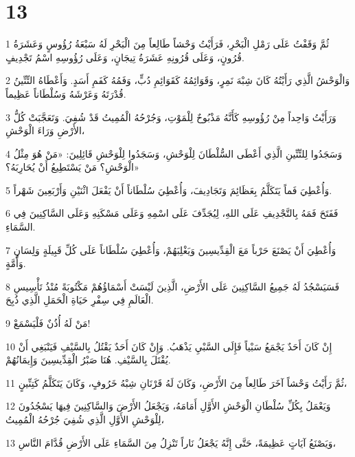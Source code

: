 \chapter{13}

\par 1 ثُمَّ وَقَفْتُ عَلَى رَمْلِ الْبَحْرِ، فَرَأَيْتُ وَحْشاً طَالِعاً مِنَ الْبَحْرِ لَهُ سَبْعَةُ رُؤُوسٍ وَعَشَرَةُ قُرُونٍ، وَعَلَى قُرُونِهِ عَشَرَةُ تِيجَانٍ، وَعَلَى رُؤُوسِهِ اسْمُ تَجْدِيفٍ.
\par 2 وَالْوَحْشُ الَّذِي رَأَيْتُهُ كَانَ شِبْهَ نَمِرٍ، وَقَوَائِمُهُ كَقَوَائِمِ دُبٍّ، وَفَمُهُ كَفَمِ أَسَدٍ. وَأَعْطَاهُ التِّنِّينُ قُدْرَتَهُ وَعَرْشَهُ وَسُلْطَاناً عَظِيماً.
\par 3 وَرَأَيْتُ وَاحِداً مِنْ رُؤُوسِهِ كَأَنَّهُ مَذْبُوحٌ لِلْمَوْتِ، وَجُرْحُهُ الْمُمِيتُ قَدْ شُفِيَ. وَتَعَجَّبَتْ كُلُّ الأَرْضِ وَرَاءَ الْوَحْشِ،
\par 4 وَسَجَدُوا لِلتِّنِّينِ الَّذِي أَعْطَى السُّلْطَانَ لِلْوَحْشِ، وَسَجَدُوا لِلْوَحْشِ قَائِلِينَ: «مَنْ هُوَ مِثْلُ الْوَحْشِ؟ مَنْ يَسْتَطِيعُ أَنْ يُحَارِبَهُ؟»
\par 5 وَأُعْطِيَ فَماً يَتَكَلَّمُ بِعَظَائِمَ وَتَجَادِيفَ، وَأُعْطِيَ سُلْطَاناً أَنْ يَفْعَلَ اثْنَيْنِ وَأَرْبَعِينَ شَهْراً.
\par 6 فَفَتَحَ فَمَهُ بِالتَّجْدِيفِ عَلَى اللهِ، لِيُجَدِّفَ عَلَى اسْمِهِ وَعَلَى مَسْكَنِهِ وَعَلَى السَّاكِنِينَ فِي السَّمَاءِ.
\par 7 وَأُعْطِيَ أَنْ يَصْنَعَ حَرْباً مَعَ الْقِدِّيسِينَ وَيَغْلِبَهُمْ، وَأُعْطِيَ سُلْطَاناً عَلَى كُلِّ قَبِيلَةٍ وَلِسَانٍ وَأُمَّةٍ.
\par 8 فَسَيَسْجُدُ لَهُ جَمِيعُ السَّاكِنِينَ عَلَى الأَرْضِ، الَّذِينَ لَيْسَتْ أَسْمَاؤُهُمْ مَكْتُوبَةً مُنْذُ تَأْسِيسِ الْعَالَمِ فِي سِفْرِ حَيَاةِ الْحَمَلِ الَّذِي ذُبِحَ.
\par 9 مَنْ لَهُ أُذُنٌ فَلْيَسْمَعْ!
\par 10 إِنْ كَانَ أَحَدٌ يَجْمَعُ سَبْياً فَإِلَى السَّبْيِ يَذْهَبُ. وَإِنْ كَانَ أَحَدٌ يَقْتُلُ بِالسَّيْفِ فَيَنْبَغِي أَنْ يُقْتَلَ بِالسَّيْفِ. هُنَا صَبْرُ الْقِدِّيسِينَ وَإِيمَانُهُمْ.
\par 11 ثُمَّ رَأَيْتُ وَحْشاً آخَرَ طَالِعاً مِنَ الأَرْضِ، وَكَانَ لَهُ قَرْنَانِ شِبْهُ خَرُوفٍ، وَكَانَ يَتَكَلَّمُ كَتِنِّينٍ،
\par 12 وَيَعْمَلُ بِكُلِّ سُلْطَانِ الْوَحْشِ الأَوَّلِ أَمَامَهُ، وَيَجْعَلُ الأَرْضَ وَالسَّاكِنِينَ فِيهَا يَسْجُدُونَ لِلْوَحْشِ الأَوَّلِ الَّذِي شُفِيَ جُرْحُهُ الْمُمِيتُ،
\par 13 وَيَصْنَعُ آيَاتٍ عَظِيمَةً، حَتَّى إِنَّهُ يَجْعَلُ نَاراً تَنْزِلُ مِنَ السَّمَاءِ عَلَى الأَرْضِ قُدَّامَ النَّاسِ،
